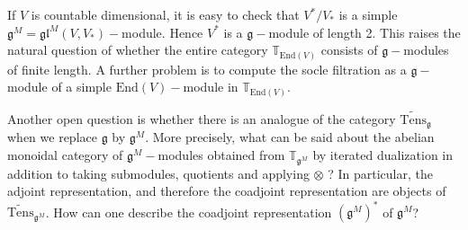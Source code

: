 \documentclass[10pt]{amsart}
\newcommand{\TT}{\mathbb{T}}
\renewcommand{\gg}{\mathfrak{g}}
\newcommand{\gl}{\mathfrak{gl}}
\newcommand{\End}{\mathrm{End}}
\begin{document}
If $V$ is countable dimensional, it is easy to check that $V^*/V_*$ is a simple $\gg^M = \gl^M(V,V_*)-$module. Hence $V^*$ is a $\gg-$module of length 2. This raises the natural question of whether the entire category $\TT_{\End(V)}$ consists of $\gg-$modules of finite length. A further problem is to compute the socle filtration as a $\gg-$module of a simple $\End(V)-$module in $\TT_{\End(V)}$.

Another open question is whether there is an analogue of the category $\widetilde{\mathrm{Tens}}_{\gg}$ when we replace $\gg$ by $\gg^M$. More precisely, 
what can be said about the abelian monoidal category of $\gg^M-$modules obtained from $\TT_{\gg^M}$ by iterated dualization in addition to taking submodules, 
quotients and applying $\otimes$ ? In particular, the adjoint representation, and therefore the coadjoint representation are objects of 
$\widetilde{\mathrm{Tens}}_{\gg^M}$.  How can one describe the coadjoint representation $(\gg^M)^*$ of $\gg^M$?
\end{document}

